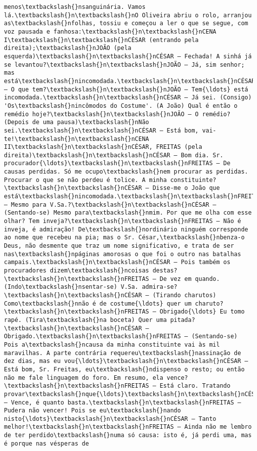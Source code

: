 \begin{Verbatim}[commandchars=\\\{\}]
menos\textbackslash{}nsanguinária. Vamos lá.\textbackslash{}n\textbackslash{}nO Oliveira abriu o rolo, arranjou as\textbackslash{}nfolhas, tossiu e começou a ler o que se segue, com voz pausada e fanhosa:\textbackslash{}n\textbackslash{}nCENA I\textbackslash{}n\textbackslash{}nCÉSAR (entrando pela direita);\textbackslash{}nJOÃO (pela esquerda)\textbackslash{}n\textbackslash{}nCÉSAR — Fechada! A sinhá já se levantou?\textbackslash{}n\textbackslash{}nJOÃO — Já, sim senhor; mas está\textbackslash{}nincomodada.\textbackslash{}n\textbackslash{}nCÉSAR — O que tem?\textbackslash{}n\textbackslash{}nJOÃO — Tem{\ldots} está incomodada.\textbackslash{}n\textbackslash{}nCÉSAR — Já sei. (Consigo) 'Os\textbackslash{}nincômodos do Costume'. (A João) Qual é então o remédio hoje?\textbackslash{}n\textbackslash{}nJOÃO — O remédio? (Depois de uma pausa)\textbackslash{}nNão sei.\textbackslash{}n\textbackslash{}nCÉSAR — Está bom, vai-te!\textbackslash{}n\textbackslash{}nCENA II\textbackslash{}n\textbackslash{}nCÉSAR, FREITAS (pela direita)\textbackslash{}n\textbackslash{}nCÉSAR — Bom dia. Sr. procurador{\ldots}\textbackslash{}n\textbackslash{}nFREITAS — De causas perdidas. Só me ocupo\textbackslash{}nem procurar as perdidas. Procurar o que se não perdeu é tolice. A minha constituinte?\textbackslash{}n\textbackslash{}nCÉSAR — Disse-me o João que está\textbackslash{}nincomodada.\textbackslash{}n\textbackslash{}nFREITAS — Mesmo para V.Sa.?\textbackslash{}n\textbackslash{}nCÉSAR — (Sentando-se) Mesmo para\textbackslash{}nmim. Por que me olha com esse olhar? Tem inveja?\textbackslash{}n\textbackslash{}nFREITAS — Não é inveja, é admiração! De\textbackslash{}nordinário ninguém corresponde ao nome que recebeu na pia; mas o Sr. César,\textbackslash{}nbenza-o Deus, não desmente que traz um nome significativo, e trata de ser nas\textbackslash{}npáginas amorosas o que foi o outro nas batalhas campais.\textbackslash{}n\textbackslash{}nCÉSAR — Pois também os procuradores dizem\textbackslash{}ncoisas destas?\textbackslash{}n\textbackslash{}nFREITAS — De vez em quando. (Indo\textbackslash{}nsentar-se) V.Sa. admira-se?\textbackslash{}n\textbackslash{}nCÉSAR — (Tirando charutos) Como\textbackslash{}nnão é de costume{\ldots} quer um charuto?\textbackslash{}n\textbackslash{}nFREITAS — Obrigado{\ldots} Eu tomo rapé. (Tira\textbackslash{}na boceta) Quer uma pitada?\textbackslash{}n\textbackslash{}nCÉSAR — Obrigado.\textbackslash{}n\textbackslash{}nFREITAS — (Sentando-se) Pois a\textbackslash{}ncausa da minha constituinte vai às mil maravilhas. A parte contrária requereu\textbackslash{}nassinação de dez dias, mas eu vou{\ldots}\textbackslash{}n\textbackslash{}nCÉSAR — Está bom, Sr. Freitas, eu\textbackslash{}ndispenso o resto; ou então não me fale linguagem do foro. Em resumo, ela vence?\textbackslash{}n\textbackslash{}nFREITAS — Está claro. Tratando provar\textbackslash{}nque{\ldots}\textbackslash{}n\textbackslash{}nCÉSAR — Vence, é quanto basta.\textbackslash{}n\textbackslash{}nFREITAS — Pudera não vencer! Pois se eu\textbackslash{}nando nisto{\ldots}\textbackslash{}n\textbackslash{}nCÉSAR — Tanto melhor!\textbackslash{}n\textbackslash{}nFREITAS — Ainda não me lembro de ter perdido\textbackslash{}numa só causa: isto é, já perdi uma, mas é porque nas vésperas de 
\end{Verbatim}
